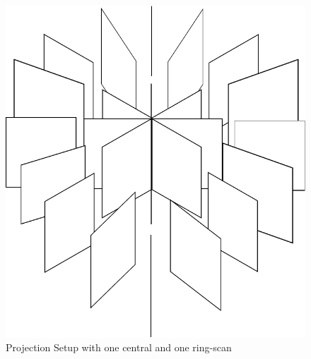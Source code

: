 \begin{figure}[tb]
	\centering
		\includegraphics[width=\imsize]{img/projections}
	\caption{Projection Setup with one central and one ring-scan}
	\label{fig:projections}
\end{figure}